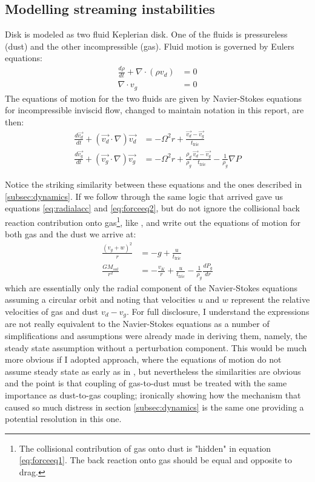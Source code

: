 \documentclass[12pt]{article}
\begin{document}
\subsection{Modelling streaming instabilities}
\label{subsec:streaminginstabilitymodel}

Disk is modeled as two fluid Keplerian disk. One of the fluids is pressureless (dust) and the other incompressible (gas). Fluid motion is governed by Eulers equations:
\begin{align}
    \label{eq:eulerseq}
    \frac{d\rho}{dt} + \nabla \cdot (\rho v_d) &= 0 \\
    \nabla \cdot v_g &= 0
\end{align}
The equations of motion for the two fluids are given by Navier-Stokes equations for incompressible inviscid flow, changed to maintain notation in this report, are then:
\begin{align}
    \label{eq:navierstokesgas}
    \frac{d \vec{v_d}}{dt} + (\vec{v_d}\cdot \nabla)\vec{v_d} &= -\Omega^2r + \frac{\vec{v_d}-\vec{v_g}}{t_\mathrm{fric}}\\
    \label{eq:navierstokesdust}
    \frac{d \vec{v_g}}{dt} + (\vec{v_g}\cdot \nabla)\vec{v_g} &= -\Omega^2r + \frac{\rho_d}{\rho_g}\frac{\vec{v_d}-\vec{v_g}}{t_\mathrm{fric}} - \frac{1}{\rho_g } \nabla P
\end{align}

Notice the striking similarity between these equations and the ones described in \ref{subsec:dynamics}. If we follow through the same logic that arrived gave us equations \ref{eq:radialacc} and \ref{eq:forceeq2}, but do not ignore the collisional back reaction contribution onto gas\footnote{The collisional contribution of gas onto dust is "hidden" in equation \ref{eq:forceeq1}. The back reaction onto gas should be equal and opposite to drag.}, like \cite{Nakagawa86}, and write out the equations of motion for both gas and the dust we arrive at:
\begin{align}
    \frac{(v_g + w)^2}{r} &= -g + \frac{u}{t_\mathrm{fric}} \\
    \frac{GM_{sol}}{r^2}  &= - \frac{v_K}{r} + \frac{u}{t_\mathrm{fric}} - \frac{1}{\rho_g}\frac{dP_g}{dr} 
\end{align}
which are essentially only the radial component of the Navier-Stokes equations assuming a circular orbit and noting that velocities $u$ and $w$ represent the relative velocities of gas and dust $v_d-v_g$. For full disclosure, I understand the expressions are not really equivalent to the Navier-Stokes equations as a number of simplifications and assumptions were already made in deriving them, namely, the steady state assumption without a perturbation component. This would be much more obvious if I adopted \cite{Nakagawa86} approach, where the equations of motion do not assume steady state as early as in \cite{Weidenschilling77}, but nevertheless the similarities are obvious and the point is that coupling of gas-to-dust must be treated with the same importance as dust-to-gas coupling; ironically showing how the mechanism that caused so much distress in section \ref{subsec:dynamics} is the same one providing a potential resolution in this one.  
\end{document}
